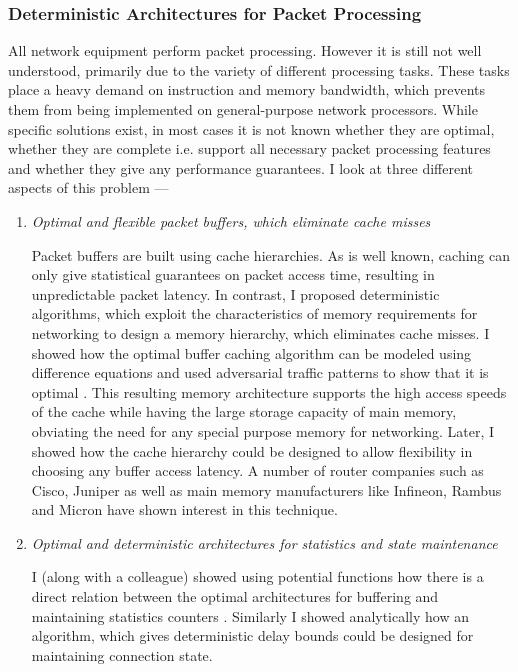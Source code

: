 \documentclass[10pt]{article}
\begin{document}
\begin{small}
\subsubsection*{\small Deterministic Architectures for Packet Processing}

All network equipment perform packet processing. However 
it is still not well understood, primarily due to the variety of
different processing tasks.
These tasks place a heavy demand on instruction and memory bandwidth, which 
prevents them from being implemented on general-purpose network processors.
While specific solutions exist, in most cases it is not known whether they
are optimal, whether they are complete i.e. support all necessary packet processing features and whether they
give any performance guarantees. I look at three different aspects of this problem ---

\begin{enumerate}

\item {\em Optimal and flexible packet buffers, which eliminate cache misses}


Packet buffers are built using cache hierarchies. As is well known, caching
can only give statistical guarantees on packet access time, resulting in unpredictable packet
latency.
In contrast, I proposed deterministic algorithms, which exploit the characteristics 
of memory requirements for networking to design a memory hierarchy, which eliminates cache misses. 
I showed how the optimal buffer caching algorithm can be modeled using difference equations and
used adversarial traffic patterns to show that it is optimal \cite{buffer}.
This resulting memory architecture supports the high access speeds of the cache while
having the large storage capacity of main memory, obviating the need for any special purpose memory
for networking.
Later, I showed how the cache hierarchy could be designed to allow 
flexibility in choosing any buffer access latency.
A number of router companies such as Cisco, Juniper as well as main memory manufacturers 
like Infineon, Rambus and Micron have shown interest in this technique.

\item {\em Optimal and deterministic architectures for statistics and state maintenance}

I (along with a colleague) showed using potential functions how there is 
a direct relation between the optimal architectures for buffering
and maintaining statistics counters \cite{stats}. 
Similarly I showed analytically how an algorithm, which gives deterministic 
delay bounds could be designed for maintaining connection state. 


\end{enumerate}
\end{small}
\end{document}
